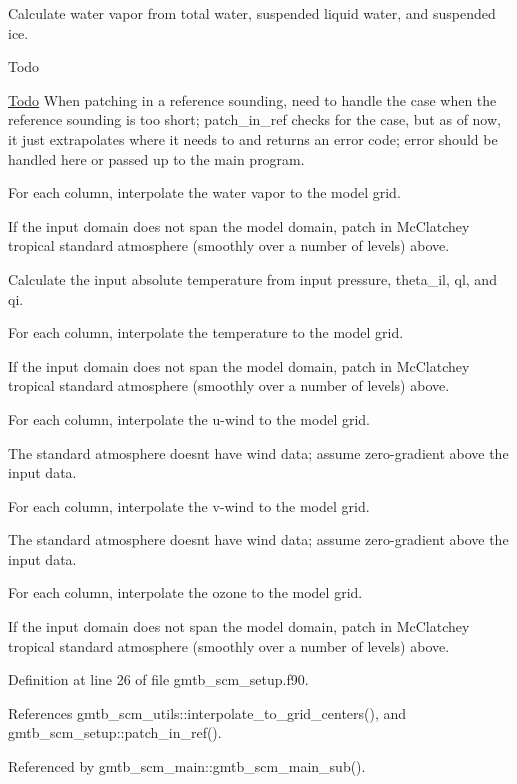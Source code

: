 \begin{DoxyItemize}
\item Calculate water vapor from total water, suspended liquid water, and suspended ice.
\item \begin{DoxyRefDesc}{Todo}
\item[\hyperlink{todo__todo000014}{Todo}]When patching in a reference sounding, need to handle the case when the reference sounding is too short; patch\+\_\+in\+\_\+ref checks for the case, but as of now, it just extrapolates where it needs to and returns an error code; error should be handled here or passed up to the main program. \end{DoxyRefDesc}

\item For each column, interpolate the water vapor to the model grid.
\begin{DoxyItemize}
\item If the input domain does not span the model domain, patch in Mc\+Clatchey tropical standard atmosphere (smoothly over a number of levels) above.
\end{DoxyItemize}
\item Calculate the input absolute temperature from input pressure, theta\+\_\+il, ql, and qi.
\item For each column, interpolate the temperature to the model grid.
\begin{DoxyItemize}
\item If the input domain does not span the model domain, patch in Mc\+Clatchey tropical standard atmosphere (smoothly over a number of levels) above.
\end{DoxyItemize}
\item For each column, interpolate the u-\/wind to the model grid.
\begin{DoxyItemize}
\item The standard atmosphere doesn\textquotesingle{}t have wind data; assume zero-\/gradient above the input data.
\end{DoxyItemize}
\item For each column, interpolate the v-\/wind to the model grid.
\begin{DoxyItemize}
\item The standard atmosphere doesn\textquotesingle{}t have wind data; assume zero-\/gradient above the input data.
\end{DoxyItemize}
\item For each column, interpolate the ozone to the model grid.
\begin{DoxyItemize}
\item If the input domain does not span the model domain, patch in Mc\+Clatchey tropical standard atmosphere (smoothly over a number of levels) above.
\end{DoxyItemize}
\end{DoxyItemize}

Definition at line 26 of file gmtb\+\_\+scm\+\_\+setup.\+f90.



References gmtb\+\_\+scm\+\_\+utils\+::interpolate\+\_\+to\+\_\+grid\+\_\+centers(), and gmtb\+\_\+scm\+\_\+setup\+::patch\+\_\+in\+\_\+ref().



Referenced by gmtb\+\_\+scm\+\_\+main\+::gmtb\+\_\+scm\+\_\+main\+\_\+sub().

